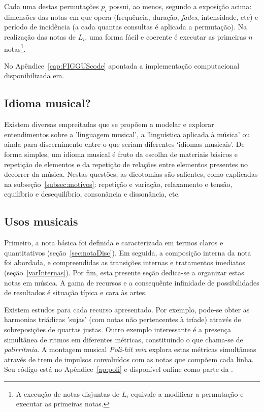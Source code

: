 Cada uma destas permutações
$p_i$ possui, ao menos, segundo a exposição acima: dimensões das notas em que opera (frequência, duração, \emph{fades}, intensidade, etc) e período de incidência (a cada quantas consultas é aplicada a permutação). Na realização das notas de $L_i$, uma forma fácil e coerente é executar as primeiras $n$ notas\footnote{A execução de notas disjuntas de $L_i$ equivale a modificar a permutação e executar as primeiras notas.}.

No Apêndice~\ref{cap:FIGGUScode} apontada a implementação computacional disponibilizada em.\cite{MASSA,figgusOriginal,figgusEspacializacao}

\subsection{Idioma musical?}

Existem diversas empreitadas que se propõem a modelar e explorar entendimentos
sobre a 'linguagem musical', a 'linguística aplicada à música' ou ainda
para discernimento entre 
o que seriam diferentes
`idiomas musicais'.\cite{Lerdahl, Harmonia, Salzer,Alfaix}
De forma simples, um idioma musical é fruto da escolha de materiais básicos e
repetição de elementos e da repetição de relações entre elementos presentes no decorrer da música. Nestas questões, as dicotomias são salientes,
como explicadas na subseção~\ref{subsec:motivos}: repetição e variação, relaxamento e tensão, equilíbrio e desequilíbrio, consonância e dissonância, etc. 

\subsection{Usos musicais}\label{subsec:usosmusicais3}

Primeiro, a nota básica foi definida e caracterizada em termos
claros e quantitativos (seção~\ref{sec:notaDisc}). Em seguida, a composição interna da nota foi abordada, e compreendidas as transições internas e tratamentos imediatos (seção~\ref{varInternas}). Por fim, esta presente seção dedica-se a organizar estas notas em música.
A gama de recursos e a consequênte infinidade de possibilidades de resultados
é situação típica e cara às artes.\cite{Harmonia,Webern}

Existem estudos para cada recurso apresentado. Por exemplo, pode-se obter as harmonias triádicas 'sujas' (com notas não pertencentes à tríade) através de sobreposições de quartas justas. Outro exemplo interessante é a presença simultânea de ritmos em diferentes métricas, constituindo o que chama-se de \emph{polirritmia}. A montagem musical \emph{Poli-hit mia} explora estas métricas simultâneas através de trem de impulsos convoluídos com as notas que compõem cada linha. Seu código está no Apêndice~\ref{ap:poli} e disponível online como parte da \massa.

